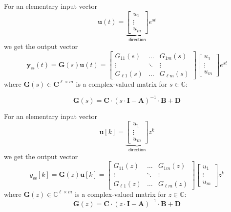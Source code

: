 For an elementary input vector
\begin{equation*}
    \mathbf{u}(t)=\underbrace{\begin{bmatrix}u_{1}  \\
            \vdots \\
            u_{m}
        \end{bmatrix}}_{\mathsf{direction}} e^{st}
\end{equation*}
we get the output vector
\begin{equation*}
    \mathbf{y}_{{\mathrm{ss}}}(t)=\mathbf{G}(s)\mathbf{u}(t)=
    \begin{bmatrix}G_{11}(s)    & \ldots & G_{1m}(s)     \\
               \vdots       & \ddots & \vdots        \\
               G_{\ell1}(s) & \ldots & G_{\ell m}(s)
    \end{bmatrix}
    \begin{bmatrix}u_{1}  \\
        \vdots \\
        u_{m}
    \end{bmatrix}e^{st}
\end{equation*}
where $\mathbf{G}(s)\in\mathbb{\mathbf{C}}^{\ell\times m}$ is a complex-valued matrix for $s\in \mathbb{C}$:

\begin{equation*}
    \mathbf{G}(s)=\mathbf{C}\cdot(s\cdot\mathbf{I}-\mathbf{A})^{-1}\cdot \mathbf{B}+\mathbf{D}
\end{equation*}


For an elementary input vector
\begin{equation*}
    \mathbf{u}[k]=\underbrace{\begin{bmatrix}u_{1}  \\
            \vdots \\
            u_{m}
        \end{bmatrix}}_{\mathsf{direction}} z^k
\end{equation*}
we get the output vector
\begin{equation*}
    y_{{\mathrm{ss}}}[k]=\mathbf{G}(z)\mathbf{u}[k]=
    \begin{bmatrix}G_{11}(z)    & \ldots & G_{1m}(z)     \\
               \vdots       & \ddots & \vdots        \\
               G_{\ell1}(z) & \ldots & G_{\ell m}(z)
    \end{bmatrix}
    \begin{bmatrix}u_{1}  \\
        \vdots \\
        u_{m}
    \end{bmatrix}z^k
\end{equation*}
where $\mathbf{G}(z)\in\mathbb{C}^{\ell\times m}$ is a complex-valued matrix for $z\in \mathbb{C}$:
\begin{equation*}
    \mathbf{G}(z)=\mathbf{C}\cdot(z\cdot\mathbf{I}-\mathbf{A})^{-1}\cdot \mathbf{B}+\mathbf{D}
\end{equation*}

